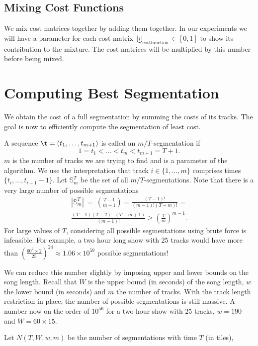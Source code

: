 \documentclass[twocolumn]{article}
\newcommand{\segs}{\mathbb S}
\begin{document}
	\subsection{Mixing Cost Functions}
	
	We mix cost matrices together by adding them together. In our experiments we will have a parameter for each cost matrix $\biguplus_{\mathrm{costfunction}} \in [0,1]$ to show its contribution to the mixture. The cost matrices will be multiplied by this number before being mixed. 
	
	\section{Computing Best Segmentation}\label{best_cost}
	
	We obtain the cost of a full segmentation by summing the costs of its tracks. The goal is now to efficiently compute the segmentation of least cost.
	
	
	A sequence $\t = (t_1, \ldots, t_{m+1})$ is called an $m/T$-segmentation if
	\[
	1 = t_1 < \ldots < t_m < t_{m+1} = T+1.
	\]
	$m$ is the number of tracks we are trying to find and is a parameter of the algorithm. We use the interpretation that track $i \in \{1, \ldots, m\}$ comprises times $\{t_i, \ldots, t_{i+1}-1\}$. Let $\segs^T_m$ be the set of all $m/T$-segmentations. Note that there is a very large number of possible segmentations 
	\begin{multline*}
		|\segs^T_m| ~=~ \binom{T-1}{m-1}
		= \frac{(T-1)!}{(m-1)!(T-m)!} =\\
		\frac{(T-1)(T-2)\cdots(T-m+1)}{(m-1)!} \ge \left( \frac{T}{m}\right)^{m-1}.
	\end{multline*} 
	For large values of $T$, considering all possible segmentations using brute force is infeasible. For example, a two hour long show with $25$ tracks would have more than $\left( \frac{60^2 \times 2}{25}\right)^{24}  \approx 1.06 \times 10^{59}$ possible segmentations! 
	
	We can reduce this number slightly by imposing upper and lower bounds on the song length.  Recall that $W$ is the upper bound (in seconds) of the song length, $w$ the lower bound (in seconds) and $m$ the number of tracks. With the track length restriction in place, the number of possible segmentations is still massive. A number now on the order of $10^{56}$ for a two hour show with $25$ tracks, $w=190$ and $W=60\times15$.
	
	
	
	Let $N(T,W,w,m)$ be the number of segmentations with time $T$ (in tiles),
	
\end{document}
